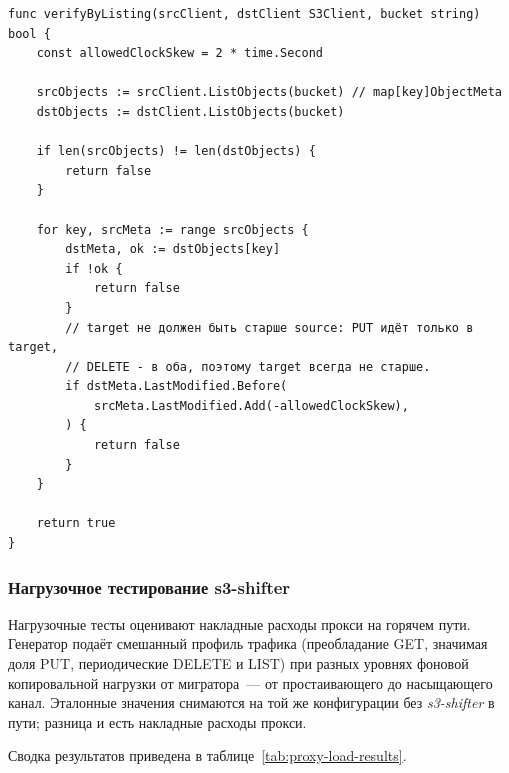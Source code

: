 \begin{listing}[ht]
\begin{verbatim}
func verifyByListing(srcClient, dstClient S3Client, bucket string) bool {
    const allowedClockSkew = 2 * time.Second

    srcObjects := srcClient.ListObjects(bucket) // map[key]ObjectMeta
    dstObjects := dstClient.ListObjects(bucket)

    if len(srcObjects) != len(dstObjects) {
        return false
    }

    for key, srcMeta := range srcObjects {
        dstMeta, ok := dstObjects[key]
        if !ok {
            return false
        }
        // target не должен быть старше source: PUT идёт только в target,
        // DELETE - в оба, поэтому target всегда не старше.
        if dstMeta.LastModified.Before(
            srcMeta.LastModified.Add(-allowedClockSkew),
        ) {
            return false
        }
    }

    return true
}
\end{verbatim}
\caption{Сверка листингов и дат модификации между источником и целью}
\label{lst:integrity}
\end{listing}

\subsubsection{Нагрузочное тестирование s3-shifter}\label{subsubsec:load-test}

Нагрузочные тесты оценивают накладные расходы прокси на горячем пути.
Генератор подаёт смешанный профиль трафика (преобладание GET, значимая доля PUT, периодические DELETE и LIST) при разных уровнях фоновой копировальной нагрузки от мигратора~--- от простаивающего до насыщающего канал.
Эталонные значения снимаются на той же конфигурации без \textit{s3-shifter} в пути; разница и есть накладные расходы прокси.

Сводка результатов приведена в таблице~\ref{tab:proxy-load-results}.

